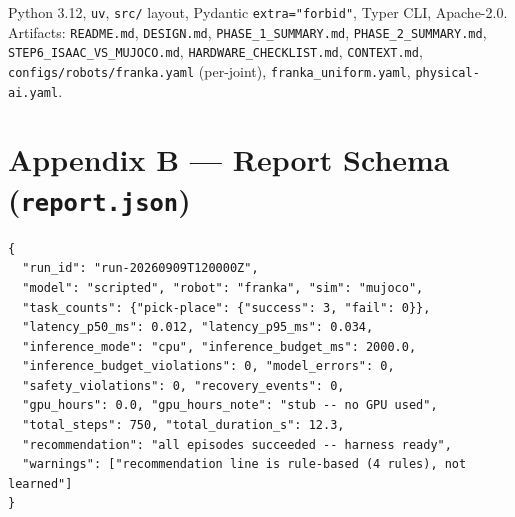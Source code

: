 \documentclass[11pt,a4paper,twocolumn]{article}
\begin{document}
Python 3.12, \texttt{uv}, \texttt{src/} layout, Pydantic \texttt{extra="forbid"}, Typer CLI, Apache-2.0. Artifacts: \texttt{README.md}, \texttt{DESIGN.md}, \texttt{PHASE\_1\_SUMMARY.md}, \texttt{PHASE\_2\_SUMMARY.md}, \texttt{STEP6\_ISAAC\_VS\_MUJOCO.md}, \texttt{HARDWARE\_CHECKLIST.md}, \texttt{CONTEXT.md}, \texttt{configs/robots/franka.yaml} (per-joint), \texttt{franka\_uniform.yaml}, \texttt{physical-ai.yaml}.

\section*{Appendix B --- Report Schema (\texttt{report.json})}

\begin{lstlisting}[style=code]
{
  "run_id": "run-20260909T120000Z",
  "model": "scripted", "robot": "franka", "sim": "mujoco",
  "task_counts": {"pick-place": {"success": 3, "fail": 0}},
  "latency_p50_ms": 0.012, "latency_p95_ms": 0.034,
  "inference_mode": "cpu", "inference_budget_ms": 2000.0,
  "inference_budget_violations": 0, "model_errors": 0,
  "safety_violations": 0, "recovery_events": 0,
  "gpu_hours": 0.0, "gpu_hours_note": "stub -- no GPU used",
  "total_steps": 750, "total_duration_s": 12.3,
  "recommendation": "all episodes succeeded -- harness ready",
  "warnings": ["recommendation line is rule-based (4 rules), not learned"]
}
\end{lstlisting}
\end{document}
